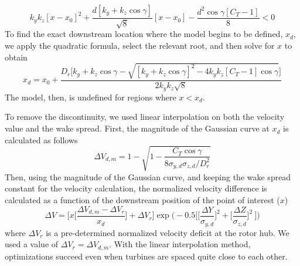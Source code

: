 \documentclass[conf]{new-aiaa}
\begin{document}
%
\begin{equation}
	k_y k_z [x-x_0]^2 + \frac{d[k_y+k_z \cos{\gamma}]}{\sqrt{8}}[x-x_0] - \frac{d^2 \cos{\gamma}[C_T -1]}{8} < 0
\end{equation}
%
To find the exact downstream location where the model begins to be defined, $x_d$, we apply the quadratic formula, select the relevant root, and then solve for $x$ to obtain
%
\begin{equation}\label{eq:xd}
	x_d = x_0 + \frac{D_r\Big[k_y+k_z\cos{\gamma} - \sqrt{[k_y+k_z\cos{\gamma}]^2-4k_y k_z[C_T-1]\cos{\gamma}}\Big]}{2k_y k_z\sqrt{8}}
\end{equation}
%
The model, then, is undefined for regions where $x<x_d$. 

\vspace{5mm}

To remove the discontinuity, we used linear interpolation on both the velocity value and the wake spread. First, the magnitude of the Gaussian curve at $x_d$ is calculated as follows
%
\begin{equation}
	\Delta V_{d,m} = 1 - \sqrt{1 - \frac{C_T \cos{\gamma}}{8 \sigma_{y,d}  \sigma_{z,d}/D_r^2}}
\end{equation}
%
Then, using the magnitude of the Gaussian curve, and keeping the wake spread constant for the velocity calculation, the normalized velocity difference is calculated as a function of the downstream position of the point of interest ($x$)
\begin{equation}
	\Delta V = \bigg[x\bigg[\frac{\Delta V_{d,m} - \Delta V_r}{x_d}\bigg] + \Delta V_r\bigg]
        \exp{\bigg(-0.5  \bigg[\bigg[\frac{\Delta Y }{ \sigma_{y,d}}\bigg]^2+\bigg[\frac{\Delta Z }{ \sigma_{z,d}}\bigg]^2~\bigg]\bigg)}
\end{equation}
%
where $\Delta V_r$ is a pre-determined normalized velocity deficit at the rotor hub. We used a value of $\Delta V_r=\Delta V_{d,m}$. With the linear interpolation method, optimizations succeed even when turbines are spaced quite close to each other.
\end{document}
